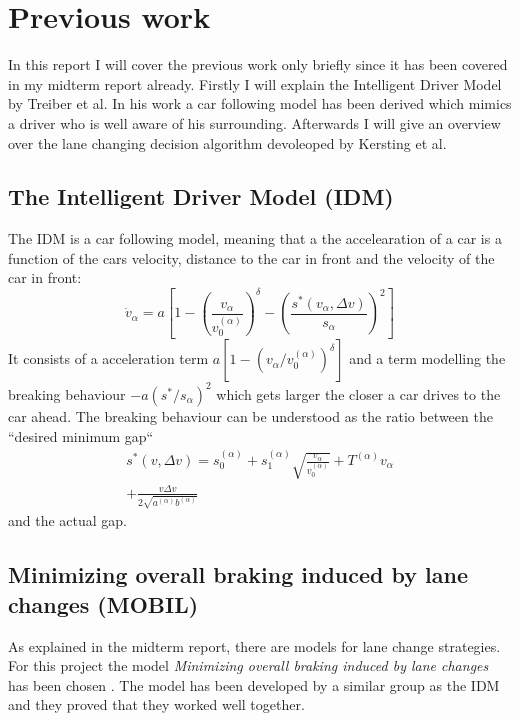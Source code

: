 \section{Previous work}
\label{sec:previous_work}
In this report I will cover the previous work only briefly since it has been covered in my midterm report already.
Firstly I will explain the Intelligent Driver Model by Treiber et al. In his work a car following model has been derived
which mimics a driver who is well aware of his surrounding. Afterwards I will give an overview over the lane changing
decision algorithm devoleoped by Kersting et al.

\subsection{The Intelligent Driver Model (IDM)}
\label{sec:idm}
The IDM is a car following model, meaning that a the accelearation of a car is a function of the cars velocity,
distance to the car in front and the velocity of the car in front:
\begin{equation}
  \dot v_\alpha = a \left[1 - \left(\frac{v_\alpha}{v_0^{(\alpha)}}\right)^\delta -
    \left(\frac{s^*(v_\alpha, \Delta v)}{s_\alpha}\right)^2
  \right]
  \label{eqn:idm:sprime}
\end{equation}
It consists of a acceleration term $a [1 - (v_\alpha / v_0^{(\alpha)})^\delta]$ and a term modelling the breaking
behaviour $-a (s^* / s_\alpha)^2$ which gets larger the closer a car drives to the car ahead. The breaking behaviour
can be understood as the ratio between the ``desired minimum gap``
\begin{multline}
  s^*(v, \Delta v) = s_0^{(\alpha)} + s_1^{(\alpha)} \sqrt{\frac{v_\alpha}{v_0^{(\alpha)}}} + T^{(\alpha)}v_\alpha
  \\
  + \frac{v\Delta v}{2 \sqrt{a^{(\alpha)} b^{(\alpha)}}}
\end{multline}
and the actual gap.

\subsection{Minimizing overall braking induced by lane changes (MOBIL)}
\label{sec:mobil}
As explained in the midterm report, there are models for lane change strategies. For this project the model 
\textit{Minimizing overall braking induced by lane changes} has been chosen \cite{MOBIL}. The model has been developed by
a similar group as the IDM and they proved that they worked well together. 

